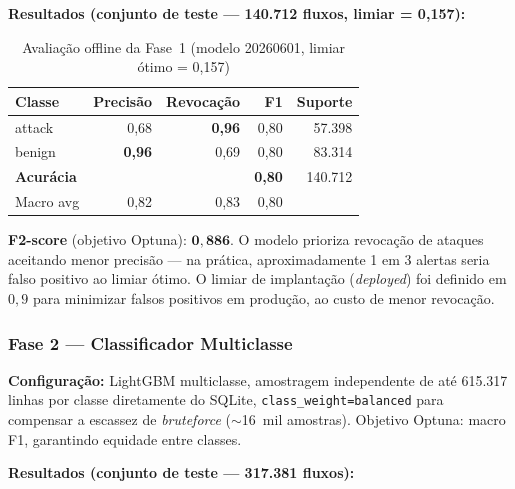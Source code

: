 \documentclass[12pt]{article}
\begin{document}
\textbf{Resultados (conjunto de teste — 140.712 fluxos, limiar = 0,157):}

\begin{table}[ht]
\centering
\caption{Avaliação offline da Fase~1 (modelo 20260601, limiar ótimo = 0,157)}
\label{tab:phase1_offline}
\begin{tabular}{@{}lrrrr@{}}
\toprule
\textbf{Classe} & \textbf{Precisão} & \textbf{Revocação} & \textbf{F1} & \textbf{Suporte} \\ \midrule
attack  & 0,68 & \textbf{0,96} & 0,80 & 57.398 \\
benign  & \textbf{0,96} & 0,69 & 0,80 & 83.314 \\ \midrule
\textbf{Acurácia} & & & \textbf{0,80} & 140.712 \\
Macro avg & 0,82 & 0,83 & 0,80 & \\
\bottomrule
\end{tabular}
\end{table}

\textbf{F2-score} (objetivo Optuna): $\mathbf{0{,}886}$. O modelo prioriza
revocação de ataques aceitando menor precisão — na prática, aproximadamente
1 em 3 alertas seria falso positivo ao limiar ótimo. O limiar de
implantação (\textit{deployed}) foi definido em $0{,}9$ para minimizar falsos
positivos em produção, ao custo de menor revocação.

\subsubsection{Fase 2 — Classificador Multiclasse}

\textbf{Configuração:} LightGBM multiclasse, amostragem independente de até
615.317 linhas por classe diretamente do SQLite, \texttt{class\_weight=balanced}
para compensar a escassez de \textit{bruteforce} ($\sim$16~mil amostras).
Objetivo Optuna: macro F1, garantindo equidade entre classes.

\textbf{Resultados (conjunto de teste — 317.381 fluxos):}
\end{document}
